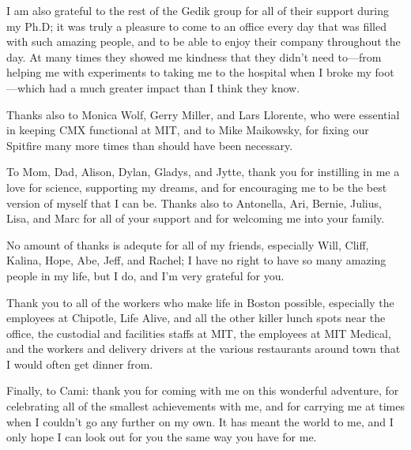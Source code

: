 I am also grateful to the rest of the Gedik group for all of their support during my Ph.D; it was truly a pleasure to come to an office every day that was filled with such amazing people, and to be able to enjoy their company throughout the day.
At many times they showed me kindness that they didn't need to---from helping me with experiments to taking me to the hospital when I broke my foot---which had a much greater impact than I think they know.

Thanks also to Monica Wolf, Gerry Miller, and Lars Llorente, who were essential in keeping CMX functional at MIT, and to Mike Maikowsky, for fixing our Spitfire many more times than should have been necessary.

To Mom, Dad, Alison, Dylan, Gladys, and Jytte, thank you for instilling in me a love for science, supporting my dreams, and for encouraging me to be the best version of myself that I can be.
Thanks also to Antonella, Ari, Bernie, Julius, Lisa, and Marc for all of your support and for welcoming me into your family.

No amount of thanks is adequte for all of my friends, especially Will, Cliff, Kalina, Hope, Abe, Jeff, and Rachel; I have no right to have so many amazing people in my life, but I do, and I'm very grateful for you.

Thank you to all of the workers who make life in Boston possible, especially the employees at Chipotle, Life Alive, and all the other killer lunch spots near the office, the custodial and facilities staffs at MIT, the employees at MIT Medical, and the workers and delivery drivers at the various restaurants around town that I would often get dinner from.

Finally, to Cami: thank you for coming with me on this wonderful adventure, for celebrating all of the smallest achievements with me, and for carrying me at times when I couldn't go any further on my own.
It has meant the world to me, and I only hope I can look out for you the same way you have for me.




